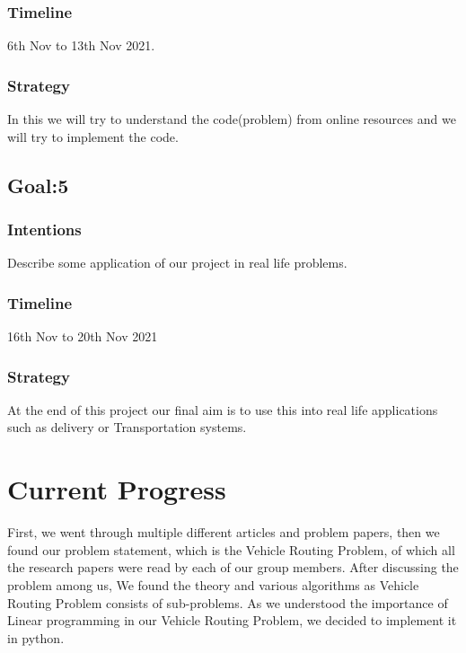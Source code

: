 \documentclass[conference]{IEEEtran}
\begin{document}
\subsubsection{{\textbf{Timeline}}}6th Nov  to 13th Nov 2021.  \\

 
\subsubsection{{\textbf{Strategy}}}
 In this we will try to understand the code(problem) from online resources and we will try to implement the code.  

\subsection{{\textbf{Goal:5}}}

\subsubsection{{\textbf{Intentions}}}
Describe some application of our project in real life problems. \\  


\subsubsection{{\textbf{Timeline}}}16th Nov to 20th Nov 2021   \\

 
\subsubsection{{\textbf{Strategy}}}
At the end of this project our final aim is to use this into real life applications such as delivery or Transportation systems.   \\

\section{{\textbf{Current Progress}}}
First, we went through multiple different articles and problem papers, then we found our problem statement, which is the Vehicle Routing Problem, of which all the research papers were read by each of our group members. After discussing the problem among us, We found the theory and various algorithms as Vehicle Routing Problem consists of sub-problems. As we understood the importance of Linear programming in our Vehicle Routing Problem, we decided to implement it in python.
\end{document}
